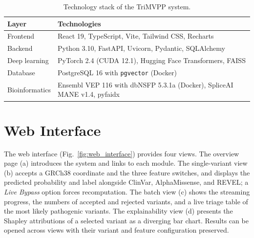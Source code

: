 \begin{table}[htbp]
    \centering
    \caption{Technology stack of the TriMVPP system.}
    \label{tab:tech_stack}
    \begin{tabular}{ll}
        \toprule
        \textbf{Layer} & \textbf{Technologies} \\
        \midrule
        Frontend & React 19, TypeScript, Vite, Tailwind CSS, Recharts \\
        Backend & Python 3.10, FastAPI, Uvicorn, Pydantic, SQLAlchemy \\
        Deep learning & PyTorch 2.4 (CUDA 12.1), Hugging Face Transformers, FAISS \\
        Database & PostgreSQL 16 with \texttt{pgvector} (Docker) \\
        Bioinformatics & Ensembl VEP 116 with dbNSFP 5.3.1a (Docker), SpliceAI MANE v1.4, pyfaidx \\
        \bottomrule
    \end{tabular}
\end{table}

\section{Web Interface}
\label{sec:web_interface}

The web interface (Fig.~\ref{fig:web_interface}) provides four views. The overview page (a) introduces the system and links to each module. The single-variant view (b) accepts a GRCh38 coordinate and the three feature switches, and displays the predicted probability and label alongside ClinVar, AlphaMissense, and REVEL; a \textit{Live Bypass} option forces recomputation. The batch view (c) shows the streaming progress, the numbers of accepted and rejected variants, and a live triage table of the most likely pathogenic variants. The explainability view (d) presents the Shapley attributions of a selected variant as a diverging bar chart. Results can be opened across views with their variant and feature configuration preserved.

